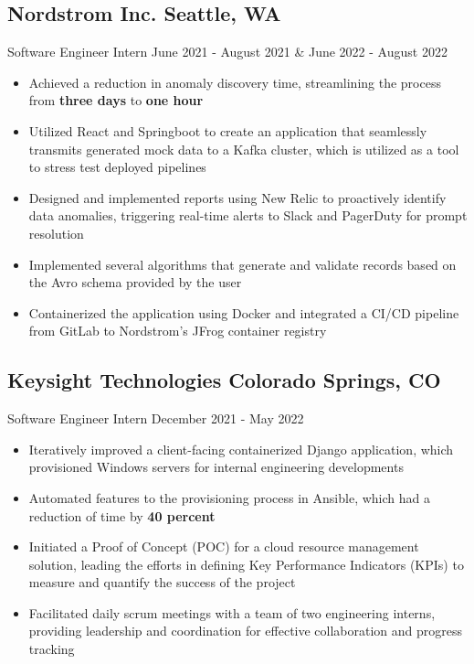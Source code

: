 \documentclass[a4,10pt]{article}
\newcommand{\subtext}[1]{
#1\par\vspace{-0.2cm}}
\newenvironment{zitemize}{
\begin{itemize}\itemsep0pt \parskip0pt \parsep1pt}
{\end{itemize}\vspace{-0.5cm}}
\begin{document}
\subsection*{Nordstrom Inc. \hfill Seattle, WA} 
\subtext{Software Engineer Intern \hfill June 2021 - August 2021 \& June 2022 - August 2022} 
    \begin{zitemize}
        \item Achieved a reduction in anomaly discovery time, streamlining the process from \textbf{three days} to \textbf{one hour}
         \item Utilized React and Springboot to create an application that seamlessly transmits generated mock data to a Kafka cluster, which is utilized as a tool to stress test deployed pipelines
        \item Designed and implemented reports using New Relic to proactively identify data anomalies, triggering real-time alerts to Slack and PagerDuty for prompt resolution
        \item Implemented several algorithms that generate and validate records based on the Avro schema provided by the user
        \item Containerized the application using Docker and integrated a CI/CD pipeline from GitLab to Nordstrom's JFrog container registry


        
    
    \end{zitemize}



\subsection*{Keysight Technologies \hfill Colorado Springs, CO} 
\subtext{Software Engineer Intern \hfill December 2021 - May 2022}
    \begin{zitemize}
        \item Iteratively improved a client-facing containerized Django application, which provisioned Windows servers for internal engineering developments
        \item Automated features to the provisioning process in Ansible, which had a reduction of time by \textbf{40 percent}
        \item Initiated a Proof of Concept (POC) for a cloud resource management solution, leading the efforts in defining Key Performance Indicators (KPIs) to measure and quantify the success of the project
        \item Facilitated daily scrum meetings with a team of two engineering interns, providing leadership and coordination for effective collaboration and progress tracking
    
    \end{zitemize}
\end{document}
